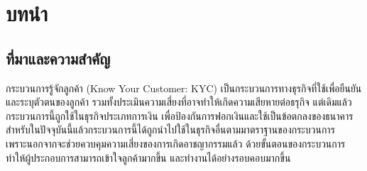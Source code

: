 \chapter{บทนำ}
\label{chapter:introduction}

\section{ที่มาและความสำคัญ}

กระบวนการรู้จักลูกค้า (Know Your Customer: KYC) เป็นกระบวนการทางธุรกิจที่ใช้เพื่อยืนยันและระบุตัวตนของลูกค้า รวมทั้งประเมินความเสี่ยงที่อาจทำให้เกิดความเสียหายต่อธรุกิจ แต่เดิมแล้ว กระบวนการนี้ถูกใช้ในธุรกิจประเภทการเงิน เพื่อป้องกันการฟอกเงินและใช้เป็นข้อตกลงของธนาคาร สำหรับในปัจจุบันนี้แล้วกระบวนการนี้ได้ถูกนำไปใช้ในธุรกิจอื่นตามมาตราฐานของกระบวนการ~\cite{Nobody06} เพราะนอกจากจะช่วยควบคุมความเสี่ยงของการเกิดอาชญากรรมแล้ว ด้วยขั้นตอนของกระบวนการทำให้ผู้ประกอบการสามารถเข้าใจลูกค้ามากขึ้น และทำงานได้อย่างรอบคอบมากขึ้น